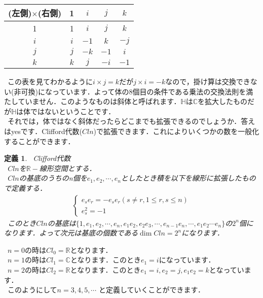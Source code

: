\documentclass[./main]{subfiles} %
\theoremstyle{idefinition}
\newtheorem{idefi}{定義}[section]
\begin{document}
\begin{center}
\begin{tabular}{|c|c|c|c|c|}\hline
(左側)$\times$(右側) & 1 & $i$ & $j$ & $k$ \\\hline
1 & 1 & $i$ & $j$ & $k$ \\\hline
$i$ & $i$ & $-1$ & $k$ & $-j$ \\\hline
$j$ & $j$ & $-k$ & $-1$ & $i$ \\\hline
$k$ & $k$ & $j$ & $-i$ & $-1$ \\\hline
\end{tabular}
\end{center}


\ この表を見てわかるように$i\times j=k$だが$j\times i=-k$なので，掛け算は交換できない(非可換)になっています．よって体の8個目の条件である乗法の交換法則を満たしていません．このようなものは斜体と呼ばれます．$\mathbb{H}$は$\mathbb{C}$を拡大したものだが$\mathbb{H}$は体ではないということです．\\ 

\ それでは，体ではなく斜体だったらどこまでも拡張できるのでしょうか．答えはyesです．Clifford代数($Cln$)で拡張できます．これによりいくつかの数を一般化することができます．\\

\begin{idefi}
\ Clifford代数\\
\ $Cln$を$\mathbb{R}-$線形空間とする．\\
\ $Cln$の基底のうちのn個を$e_1,e_2,\cdots ,e_n$としたとき積を以下を線形に拡張したもので定義する．\\
\begin{eqnarray}
\left\{
\begin{array}{l}
e_s e_r=-e_s e_r (s\neq r , 1\leq r,s \leq n)\\
e_s^2=-1
\end{array}
\right.
\end{eqnarray}
\ このとき$Cln$の基底は$\{1,e_1,e_2,\cdots,e_n,e_1e_2,e_2e_3,\cdots,e_{n-1}e_n,\cdots,e_1e_2\cdots e_n \}$の$2^n$個になります．よって次元は基底の個数である$\dim{Cln}=2^n$になります．\\
\end{idefi}

\ $n=0$の時は$Cl_0=\mathbb{R}$となります．\\
\ $n=1$の時は$Cl_1=\mathbb{C}$となります．このとき$e_1=i$になっています．\\
\ $n=2$の時は$Cl_2=\mathbb{R}$となります．このとき$e_1=i,e_2=j,e_1e_2=k$となっています．\\
\ このようにして$n=3,4,5,\cdots$ と定義していくことができます．\\
\end{document}

